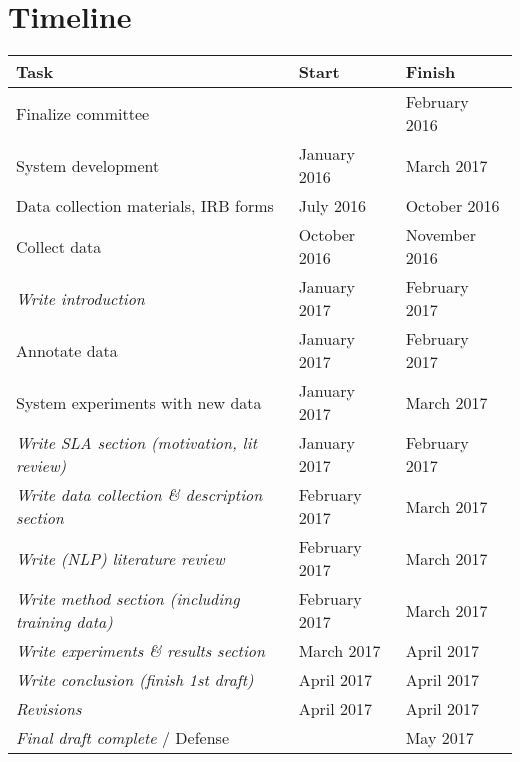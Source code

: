 \documentclass[11pt]{article}
\begin{document}
\newpage

\section{Timeline}
\begin{center}
\begin{tabular}{|l|l|l|}
  \hline
  \textbf{Task} & \textbf{Start} & \textbf{Finish} \\
  \hline
  \hline
  Finalize committee & & February 2016 \\
  \hline
  \hline
  System development & January 2016 & March 2017 \\
  \hline
  Data collection materials, IRB forms & July 2016 & October 2016 \\
  \hline
  Collect data & October 2016 & November 2016 \\
  \hline
  \textit{Write introduction} & January 2017 & February 2017 \\
  \hline
  Annotate data & January 2017 & February 2017 \\
  \hline
  System experiments with new data & January 2017 & March 2017 \\
  \hline
  \textit{Write SLA section (motivation, lit review)} & January 2017 & February 2017 \\
  \hline
  \textit{Write data collection \& description section} & February 2017 & March 2017 \\
  \hline
  \textit{Write (NLP) literature review} & February 2017 & March 2017 \\
  \hline
  \textit{Write method section (including training data)} & February 2017 & March 2017 \\
  \hline
  \textit{Write experiments \& results section} & March 2017 & April 2017 \\
  \hline
  \textit{Write conclusion (finish 1st draft)} & April 2017 & April 2017 \\
  \hline
  \textit{Revisions} & April 2017 & April 2017 \\
  \hline
  \textit{Final draft complete} / Defense & & May 2017 \\
  \hline
\end{tabular}
\end{center}
\end{document}
